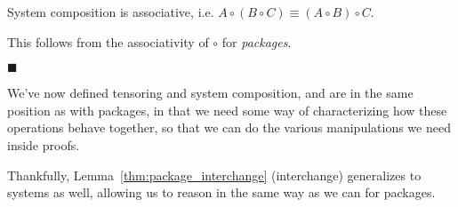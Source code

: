 \begin{lemma}
System composition is associative, i.e. $A \circ (B \circ C) \equiv (A \circ B) \circ C$.

 This follows from the associativity of $\circ$ for \emph{packages}.

$\blacksquare$
\end{lemma}

We've now defined tensoring and system composition,
and are in the same position as with packages, in that we need
some way of characterizing how these operations behave together,
so that we can do the various manipulations we need inside proofs.

Thankfully, Lemma~\ref{thm:package_interchange} (interchange) generalizes
to systems as well, allowing us to reason in the same way
as we can for packages.

